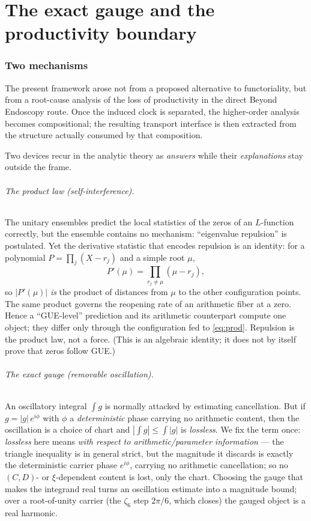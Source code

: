 \documentclass[11pt]{article}
\theoremstyle{definition}
\begin{document}
\part{The exact gauge and the productivity boundary}

\section{Two mechanisms}\label{sec:two}

The present framework arose not from a proposed alternative to functoriality, but from a root-cause
analysis of the loss of productivity in the direct Beyond Endoscopy route. Once the induced clock is
separated, the higher-order analysis becomes compositional; the resulting transport interface is then
extracted from the structure actually consumed by that composition.

Two devices recur in the analytic theory as \emph{answers} while their \emph{explanations} stay
outside the frame.

\paragraph{The product law (self-interference).} The unitary ensembles predict the local statistics
of the zeros of an $L$-function correctly, but the ensemble contains no mechanism: ``eigenvalue repulsion'' is
postulated. Yet the derivative statistic that encodes repulsion is an identity: for a polynomial
$P=\prod_j(X-r_j)$ and a simple root $\mu$,
\begin{equation}\label{eq:prod}
  P'(\mu)=\prod_{r_j\neq\mu}(\mu-r_j),
\end{equation}
so $|P'(\mu)|$ \emph{is} the product of distances from $\mu$ to the other configuration points. The
same product governs the reopening rate of an arithmetic fiber at a zero. Hence a ``GUE-level''
prediction and its arithmetic counterpart compute one object; they differ only through the
configuration fed to \eqref{eq:prod}. Repulsion is the product law, not a force. (This is an
algebraic identity; it does not by itself prove that zeros follow GUE.)

\paragraph{The exact gauge (removable oscillation).} An oscillatory integral $\int g$ is normally
attacked by estimating cancellation. But if $g=|g|\,e^{i\phi}$ with $\phi$ a \emph{deterministic}
phase carrying no arithmetic content, then the oscillation is a choice of chart and
$|\int g|\le\int|g|$ is \emph{lossless}. We fix the term once: \emph{lossless} here means \emph{with
respect to arithmetic/parameter information} --- the triangle inequality is in general strict, but the
magnitude it discards is exactly the deterministic carrier phase $e^{i\phi}$, carrying no arithmetic
cancellation; so no $(C,D)$- or $\xi$-dependent content is lost, only the chart. Choosing the gauge that
makes the integrand real turns an oscillation estimate into a magnitude bound; over a root-of-unity
carrier (the $\zeta_6$ step $2\pi/6$, which closes) the gauged object is a real harmonic.
\end{document}
